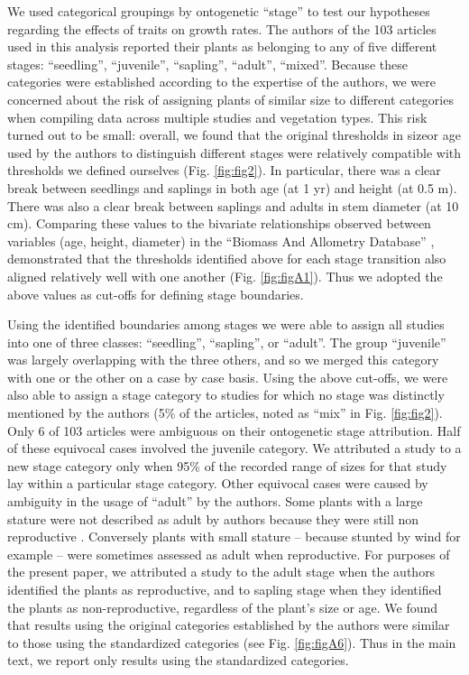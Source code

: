 \documentclass[a4paper,11pt]{article}
\begin{document}
We used categorical groupings by ontogenetic ``stage'' to test our hypotheses regarding the effects of traits on growth rates. The authors of the 103 articles used in this analysis reported their plants as belonging to any of five different stages: ``seedling'', ``juvenile'', ``sapling'', ``adult'', ``mixed''. Because these categories were established according to the expertise of the authors, we were concerned about the risk of assigning plants of similar size to different categories when compiling data across multiple studies and vegetation types. This risk turned out to be small: overall, we found that the original thresholds in sizeor age used by the authors to distinguish different stages were relatively compatible with thresholds we defined ourselves (Fig. \ref{fig:fig2}). In particular, there was a clear break between seedlings and saplings in both age (at 1 yr) and height (at 0.5 m). There was also a clear break between saplings and adults in stem diameter (at 10 cm). Comparing these values to the bivariate relationships observed between variables (age, height, diameter) in the ``Biomass And Allometry Database'' \citep{Falster:2015}, demonstrated that the thresholds identified above for each stage transition also aligned relatively well with one another (Fig. \ref{fig:figA1}). Thus we adopted the above values as cut-offs for defining stage boundaries.

Using the identified boundaries among stages we were able to assign all studies into one of three classes: ``seedling'', ``sapling'', or ``adult''. The group ``juvenile'' was largely overlapping with the three others, and so we merged this category with one or the other on a case by case basis. Using the above cut-offs, we were also able to assign a stage category to studies for which no stage was distinctly mentioned by the authors (5\% of the articles, noted as ``mix'' in Fig. \ref{fig:fig2}). Only 6 of 103 articles were ambiguous on their ontogenetic stage attribution. Half of these equivocal cases involved the juvenile category. We attributed a study to a new stage category only when 95\% of the recorded range of sizes for that study lay within a particular stage category. Other equivocal cases were caused by ambiguity in the usage of ``adult'' by the authors. Some plants with a large stature were not described as adult by authors because they were still non reproductive \citep{King:2006he}. Conversely plants with small stature -- because stunted by wind for example \citep{Stratton:2001ck} -- were sometimes assessed as adult when reproductive. For purposes of the present paper, we attributed a study to the adult stage when the authors identified the plants as reproductive, and to sapling stage when they identified the plants as non-reproductive, regardless of the plant's size or age. We found that results using the original categories established by the authors were similar to those using the standardized categories (see Fig. \ref{fig:figA6}). Thus in the main text, we report only results using the standardized categories.
\end{document}
